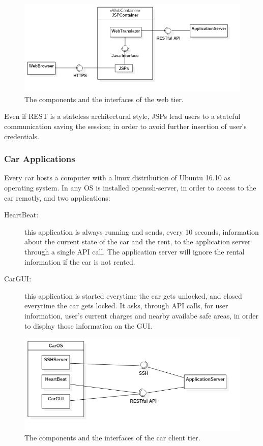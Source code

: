 \begin{figure}[H]
	\centering
	\includegraphics[width=\textwidth, keepaspectratio]{diagrams/WebComponents.png}
	\caption{The components and the interfaces of the web tier.}
	\label {fig:web-components}
\end{figure}

Even if REST is a stateless architectural style, JSPs lead users to a stateful communication saving the session; in order to avoid further insertion of user's credentials.

\subsubsection{Car Applications}

Every car hosts a computer with a linux distribution of Ubuntu 16.10 as operating system. In any OS is installed openssh-server, in order to access to the car remotly, and two applications:
\begin{description}
	\item[HeartBeat:] this application is always running and sends, every 10 seconds, information about the current state of the car and the rent, to the application server through a single API call. The application server will ignore the rental information if the car is not rented.
	\item[CarGUI:] this application is started everytime the car gets unlocked, and closed everytime the car gets locked. It asks, through API calls, for user information, user's current charges and nearby availabe safe areas, in order to display those information on the GUI.
\end{description}

\begin{figure}[H]
	\centering
	\includegraphics[width=\textwidth, keepaspectratio]{diagrams/CarClientComponents.png}
	\caption{The components and the interfaces of the car client tier.}
	\label {fig:car-client-components}
\end{figure}

